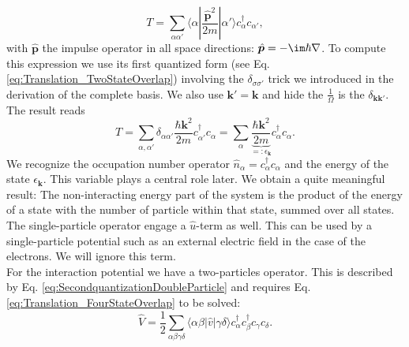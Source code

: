 \documentclass[../main.tex]{subfile}
\begin{document}
\[
    T = \sum_{\alpha\alpha'} \langle \alpha|\frac{\hat{\bm{p}}^2}{2m}|\alpha'\rangle c_{\alpha}^{\dagger}c_{\alpha'},
\]
with $\hat{\bm{p}}$ the impulse operator in all space directions: $\hat{\bm{p}} = -\im \hbar \nabla$. To compute this expression we use its 
first quantized form (see Eq. \ref{eq:Translation_TwoStateOverlap}) involving the $\delta_{\sigma\sigma'}$ trick we introduced
in the derivation of the complete basis. We also use  $\bm{k}' = \bm{k}$ and hide the $\frac{1}{\Omega}$ is the $\delta_{\bm{k}\bm{k}'}$. The result reads
\begin{equation}\label{eq:interactingGasT}
    T = \sum_{\alpha,\alpha'} \delta_{\alpha\alpha'} \frac{\hbar \bm{k}^2}{2m} c_{\alpha'}^{\dagger} c_{\alpha} 
    = \sum_{\alpha} \underbrace{\frac{\hbar \bm{k}^2}{2m}}_{=:\epsilon_{\bm{k}}} c_{\alpha}^{\dagger} c_{\alpha}.
\end{equation}
We recognize the occupation number operator $\hat{n}_{\alpha} = c_{\alpha}^{\dagger} c_{\alpha}$ and the energy of the state $\epsilon_{\bm{k}}$. This variable plays a central role later.
We obtain a quite meaningful result: The non-interacting energy part of the system is the product of the energy of a 
state with the number of particle within that state, summed over all states.
The single-particle operator engage a $\hat{u}$-term as well. This can be used by a single-particle potential such as an external electric field 
in the case of the electrons. We will ignore this term.\\

For the interaction potential we have a two-particles operator. This is described by Eq. \ref{eq:SecondquantizationDoubleParticle} and
requires Eq. \ref{eq:Translation_FourStateOverlap} to be solved:
\[
    \hat{V} = \frac{1}{2} \sum_{\alpha \beta \gamma \delta} \langle \alpha \beta |\hat{v}|\gamma\delta\rangle 
    c_{\alpha}^{\dagger}c_{\beta}^{\dagger}c_{\gamma}c_{\delta}.
\]
\end{document}
